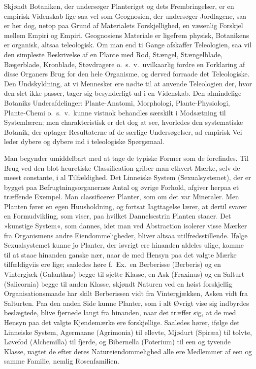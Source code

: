 \documentclass[12pt]{book}
\newcommand{\apage}[1]{\marginnote{\footnotesize\textit{[#1]}}}
\begin{document}
\noindent Skjøndt Botaniken, der undersøger Planteriget og dets
Frembringelser, er en empirisk Videnskab lige saa vel som Geognosien, der
undersøger Jordlagene, saa er her dog, netop paa Grund af Materialets
Forskjellighed, en væsenlig Forskjel mellem Empiri og Empiri. Geognosiens
Materiale er ligefrem physisk, Botanikens er organisk, altsaa teleologisk.
Om man end ti Gange afskaffer Teleologien, saa vil den simpleste
Beskrivelse af en Plante med Rod, Stængel, Stængelblade, Bægerblade,
Kronblade, Støvdragere o.\ s.\ v.\ uvilkaarlig fordre en Forklaring af disse
Organers Brug for den hele Organisme, og derved forraade det Teleologiske.
Den Undskyldning, at vi Mennesker ere nødte til at anvende Teleologien der,
hvor den slet ikke passer, tager sig besynderligt ud i en Videnskab. Den
almindelige Botaniks Underafdelinger: Plante-Anatomi, Morphologi,
Plante-Physiologi, Plante-Chemi o.\ s.\ v.\ kunne vistnok behandles særskilt i
Modsætning til Systemlæren; men charakteristisk er det dog at see,
hvorledes den systematiske Botanik, der optager Resultaterne af de særlige
Undersøgelser, ad empirisk Vei leder dybere og dybere ind i teleologiske
Spørgsmaal.

Man begynder umiddelbart med at tage de typiske Former som de forefindes.
Til Brug ved den blot heuretiske Classification griber man ethvert Mærke,
selv de meest constante, i al Tilfældighed. Det Linneiske System
(Sexualsystemet), der er bygget paa Befrugtningsorganernes Antal og øvrige
Forhold, afgiver  \apage{185} herpaa et træffende Exempel. Man classificerer Planter,
som om det var Mineraler. Men Planten fører en egen Huusholdning, og
fortsat Iagttagelse lærer, at dertil svarer en Formudvikling, som viser,
paa hvilket Dannelsestrin Planten staaer. Det »kunstige System«, som
dannes, idet man ved Abstraction isolerer visse Mærker fra Organismens
andre Eiendommeligheder, bliver altsaa utilfredsstillende. Ifølge
Sexualsystemet kunne jo Planter, der iøvrigt ere hinanden aldeles ulige,
komme til at staae hinanden ganske nær, naar de med Hensyn paa det valgte
Mærke tilfældigviis ere lige; saaledes høre f.\ Ex.\ en Berberisse
(Berberis) og en Vintergjæk (Galanthus) begge til sjette
Klasse, en Ask (Fraxinus) og en Salturt (Salicornia)
begge til anden Klasse, skjøndt Naturen ved en høist forskjellig
Organisationsmaade har skilt Berberissen vidt fra Vintergjækken, Asken vidt
fra Salturten. Paa den anden Side kunne Planter, som i alt Øvrigt vise sig
indbyrdes beslægtede, blive fjernede langt fra hinanden, naar det træffer
sig, at de med Hensyn paa det valgte Kjendemærke ere forskjellige.
Saaledes hører, ifølge det Linneiske System, Agermaane (Agrimonia)
til ellevte, Mjødurt (Spiræa) til tolvte, Løvefod
(Alchemilla) til fjerde, og Bibernella (Poterium) til een
og tyvende Klasse, uagtet de efter deres Natureiendommelighed alle ere
Medlemmer af een og samme Familie, nemlig Rosenfamilien.
\end{document}
